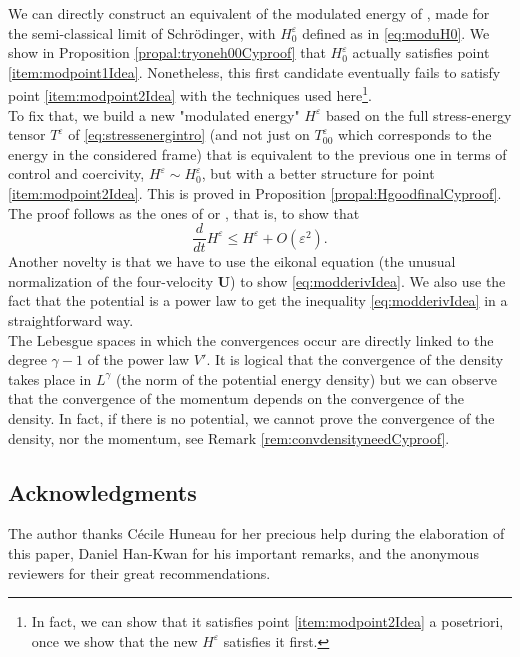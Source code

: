\documentclass[a4paper, 15pt]{article}
\numberwithin{equation}{section}
\begin{document}
We can directly construct an equivalent of the modulated energy of \cite{zbMATH05243173}, made for the semi-classical limit of Schrödinger, with $H^\varepsilon_0$ defined as in \eqref{eq:moduH0}. We show in Proposition \ref{propal:tryoneh00Cyproof} that $H^\varepsilon_0$ actually satisfies point \ref{item:modpoint1Idea}. Nonetheless, this first candidate eventually fails to satisfy point \ref{item:modpoint2Idea} with the techniques used here\footnote{In fact, we can show that it satisfies point \ref{item:modpoint2Idea} a posetriori, once we show that the new $H^\varepsilon$ satisfies it first.}. \\
To fix that, we build a new "modulated energy" $H^\varepsilon$ based on the full stress-energy tensor $T^\varepsilon$ of \eqref{eq:stressenergintro} (and not just on $T^\varepsilon_{00}$ which corresponds to the energy in the considered frame) that is equivalent to the previous one in terms of control and coercivity, $H^\varepsilon\sim H^\varepsilon_0$, but with a better structure for point \ref{item:modpoint2Idea}. This is proved in Proposition \ref{propal:HgoodfinalCyproof}.\\
The proof follows as the ones of \cite{zbMATH05243173} or \cite{zbMATH06101438}, that is, to show that 
\begin{equation}
\label{eq:modderivIdea}
    \frac{d}{dt}H^\varepsilon\leq H^\varepsilon+O(\varepsilon^2).
\end{equation}
Another novelty is that we have to use the eikonal equation (the unusual normalization of the four-velocity $\textbf{U}$) to show \eqref{eq:modderivIdea}. We also use the fact that the potential is a power law to get the inequality \eqref{eq:modderivIdea} in a straightforward way.\\
The Lebesgue spaces in which the convergences occur are directly linked to the degree $\gamma-1$ of the power law $V'$. It is logical that the convergence of the density takes place in $L^\gamma$ (the norm of the potential energy density) but we can observe that the convergence of the momentum depends on the convergence of the density. In fact, if there is no potential, we cannot prove the convergence of the density, nor the momentum, see Remark \ref{rem:convdensityneedCyproof}.\\
\subsection{Acknowledgments}
The author thanks Cécile Huneau for her precious help during the elaboration of this paper, Daniel Han-Kwan for his important remarks, and the anonymous reviewers for their great recommendations. 
\end{document}
